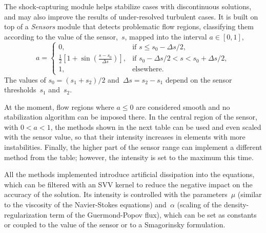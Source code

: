 \documentclass[a4paper,10pt]{report}
\begin{document}
\vspace{1ex}

The shock-capturing module helps stabilize cases with discontinuous solutions, and may also improve the results of under-resolved turbulent cases. It is built on top of a \textit{Sensors} module that detects problematic flow regions, classifying them according to the value of the sensor,~$s$, mapped into the interval $a \in [0,1]$,
%
\begin{equation*}
    a = \left\{\begin{array}{ll}
        0, & \text{if } s \leq s_0 - \Delta s / 2, \\
        \frac{1}{2}\left[1+\sin\left(\frac{s-s_0}{\Delta s}\right)\right], & \text{if } s_0 - \Delta s / 2 < s < s_0 + \Delta s / 2,  \\
        1, & \text{elsewhere}.
    \end{array}\right.
\end{equation*}
%
The values of $s_0 = (s_1 + s_2)/2$ and~$\Delta s = s_2 - s_1$ depend on the sensor thresholds~$s_1$ and~$s_2$.

At the moment, flow regions where $a \leq 0$ are considered smooth and no stabilization algorithm can be imposed there. In the central region of the sensor, with $0 < a < 1$, the methods shown in the next table can be used and even scaled with the sensor value, so that their intensity increases in elements with more instabilities. Finally, the higher part of the sensor range can implement a different method from the table; however, the intensity is set to the maximum this time.

All the methods implemented introduce artificial dissipation into the equations, which can be filtered with an SVV kernel to reduce the negative impact on the accuracy of the solution. Its intensity is controlled with the parameters~$\mu$ (similar to the viscosity of the Navier-Stokes equations) and~$\alpha$ (scaling of the density-regularization term of the Guermond-Popov flux), which can be set as constants or coupled to the value of the sensor or to a Smagorinsky formulation.
\end{document}

